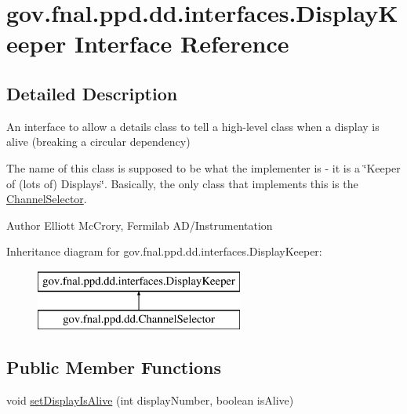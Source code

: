 \hypertarget{interfacegov_1_1fnal_1_1ppd_1_1dd_1_1interfaces_1_1DisplayKeeper}{\section{gov.\-fnal.\-ppd.\-dd.\-interfaces.\-Display\-Keeper Interface Reference}
\label{interfacegov_1_1fnal_1_1ppd_1_1dd_1_1interfaces_1_1DisplayKeeper}
}


\subsection{Detailed Description}
An interface to allow a details class to tell a high-\/level class when a display is alive (breaking a circular dependency)

The name of this class is supposed to be what the implementer is -\/ it is a \char`\"{}\-Keeper of (lots of) Displays\char`\"{}. Basically, the only class that implements this is the \hyperlink{classgov_1_1fnal_1_1ppd_1_1dd_1_1ChannelSelector}{Channel\-Selector}.

\begin{DoxyAuthor}{Author}
Elliott Mc\-Crory, Fermilab A\-D/\-Instrumentation 
\end{DoxyAuthor}
Inheritance diagram for gov.\-fnal.\-ppd.\-dd.\-interfaces.\-Display\-Keeper\-:\begin{figure}[H]
\begin{center}
\leavevmode
\includegraphics[height=2.000000cm]{interfacegov_1_1fnal_1_1ppd_1_1dd_1_1interfaces_1_1DisplayKeeper}
\end{center}
\end{figure}
\subsection*{Public Member Functions}
\begin{DoxyCompactItemize}
\item 
void \hyperlink{interfacegov_1_1fnal_1_1ppd_1_1dd_1_1interfaces_1_1DisplayKeeper_ab647c0c13a64d5c5f258852f17407639}{set\-Display\-Is\-Alive} (int display\-Number, boolean is\-Alive)
\end{DoxyCompactItemize}


